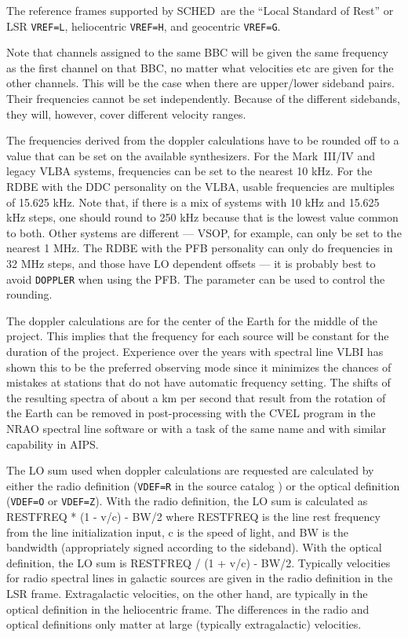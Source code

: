 \documentclass{report}
\newcommand{\schedb}{{\sc SCHED~}}
\begin{document}
The reference frames supported by \schedb are the ``Local Standard
of Rest'' or LSR {\tt VREF=L}, heliocentric {\tt VREF=H}, and
geocentric {\tt VREF=G}.

Note that channels assigned to the same BBC will be given the same
frequency as the first channel on that BBC, no matter what velocities
etc are given for the other channels.  This will be the case when
there are upper/lower sideband pairs.  Their frequencies cannot
be set independently.  Because of the different sidebands, they
will, however, cover different velocity ranges.

The frequencies derived from the doppler calculations have to be
rounded off to a value that can be set on the available synthesizers.
For the Mark~III/IV and legacy VLBA systems, frequencies can be set to
the nearest 10 kHz.  For the RDBE with the DDC personality on the
VLBA, usable frequencies are multiples of 15.625 kHz.  Note that, if
there is a mix of systems with 10 kHz and 15.625 kHz steps, one should
round to 250 kHz because that is the lowest value common to both.
Other systems are different --- VSOP, for
example, can only be set to the nearest 1 MHz.  The RDBE with the
PFB personality can only do frequencies in 32 MHz steps, and those
have LO dependent offsets --- it is probably best to avoid {\tt DOPPLER}
when using the PFB.  The parameter
 can be used to control the rounding.

The doppler calculations are for the center of the Earth for the
middle of the project. This implies that the frequency for each source
will be constant for the duration of the project. Experience over the
years with spectral line VLBI has shown this to be the preferred
observing mode since it minimizes the chances of mistakes at stations
that do not have automatic frequency setting. The shifts of the
resulting spectra of about a km per second that result from the
rotation of the Earth can be removed in post-processing with the {\sc
CVEL} program in the NRAO spectral line software or with a task of the
same name and with similar capability in {\sc AIPS}.

The LO sum used when doppler calculations are requested are calculated
by either the radio definition ({\tt VDEF=R} in the source catalog )
or the optical definition ({\tt VDEF=O} or {\tt VDEF=Z}). With the
radio definition, the LO sum is calculated as RESTFREQ * (1 - v/c) -
BW/2 where RESTFREQ is the line rest frequency from the line
initialization input, c is the speed of light, and BW is the bandwidth
(appropriately signed according to the sideband).  With the optical
definition, the LO sum is RESTFREQ / (1 + v/c) - BW/2.  Typically
velocities for radio spectral lines in galactic sources are given in
the radio definition in the LSR frame.  Extragalactic velocities, on
the other hand, are typically in the optical definition in the
heliocentric frame.  The differences in the radio and optical
definitions only matter at large (typically extragalactic) velocities.
\end{document}
